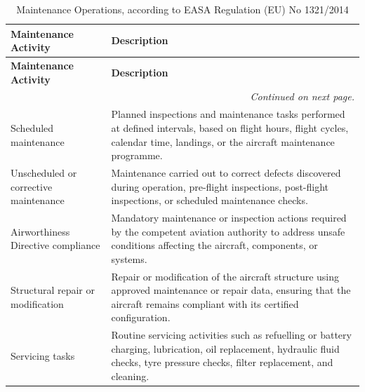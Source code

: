 \begin{longtable}{|p{}| p{}|}
\caption{Maintenance Operations, according to EASA Regulation (EU) No 1321/2014 }
\label{maintenance_operation} \\

\hline
\textbf{Maintenance Activity} & \textbf{Description} \\
\hline\hline
\endfirsthead

\hline
\textbf{Maintenance Activity} & \textbf{Description} \\
\hline\hline
\endhead

\hline
\multicolumn{2}{r}{\textit{Continued on next page.}} \\
\endfoot

\hline
\endlastfoot

Scheduled maintenance &
Planned inspections and maintenance tasks performed at defined intervals, based on flight hours, flight cycles, calendar time, landings, or the aircraft maintenance programme. \\
\hline

Unscheduled or corrective maintenance &
Maintenance carried out to correct defects discovered during operation, pre-flight inspections, post-flight inspections, or scheduled maintenance checks. \\
\hline

Airworthiness Directive compliance &
Mandatory maintenance or inspection actions required by the competent aviation authority to address unsafe conditions affecting the aircraft, components, or systems. \\
\hline


Structural repair or modification &
Repair or modification of the aircraft structure using approved maintenance or repair data, ensuring that the aircraft remains compliant with its certified configuration. \\
\hline

Servicing tasks &
Routine servicing activities such as refuelling or battery charging, lubrication, oil replacement, hydraulic fluid checks, tyre pressure checks, filter replacement, and cleaning. \\
\hline


\end{longtable}
